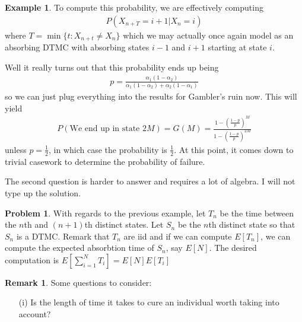 \documentclass[11pt]{amsart}
\theoremstyle{definition}
\newtheorem{remark}[theorem]{Remark}
\newtheorem{example}[theorem]{Example}
\newtheorem{problem}[theorem]{Problem}
\numberwithin{equation}{section}
\begin{document}
\begin{example}
     To compute this probability, we are effectively computing
     \begin{align*}
         P(X_{n+T}=i+1|X_n=i)
     \end{align*}
     where $T=\min\{t:X_{n+t}\ne X_n\}$
     which we may actually once again model as an absorbing DTMC with absorbing states $i-1$ and $i+1$ starting at state $i$.

     Well it really turns out that this probability ends up being
     \begin{align*}
         p=\frac{\alpha_1(1-\alpha_2)}{\alpha_1(1-\alpha_2)+\alpha_2(1-\alpha_1)}
     \end{align*}
     so we can just plug everything into the results for Gambler's ruin now. This will yield
     \begin{align*}
         P(\text{We end up in state }2M)=G(M)
         =\frac{1-\left(\frac{1-p}{p}\right)^M}{1-\left(\frac{1-p}{p}\right)^{2M}}
     \end{align*}
     unless $p=\frac{1}{2}$, in which case the probability is $\frac{1}{2}$. At this point, it comes down to trivial casework to determine the probability of failure.

     The second question is harder to answer and requires a lot of algebra. I will not type up the solution.
 \end{example}
 \begin{problem}
     With regards to the previous example, let $T_n$ be the time between the $n$th and $(n+1)$th distinct states. Let $S_n$ be the $n$th distinct state so that $S_n$ is a DTMC. Remark that $T_n$ are iid and if we can compute $E[T_n]$, we can compute the expected absorbtion time of $S_n$, say $E[N]$. The desired computation is $E[\sum_{i=1}^NT_i]=E[N]E[T_i]$
 \end{problem}
 \begin{remark}
     Some questions to consider:
     \begin{enumerate}
         \item [(i)] Is the length of time it takes to cure an individual worth taking into account?
     \end{enumerate}
 \end{remark}
 \newpage
\end{document}
